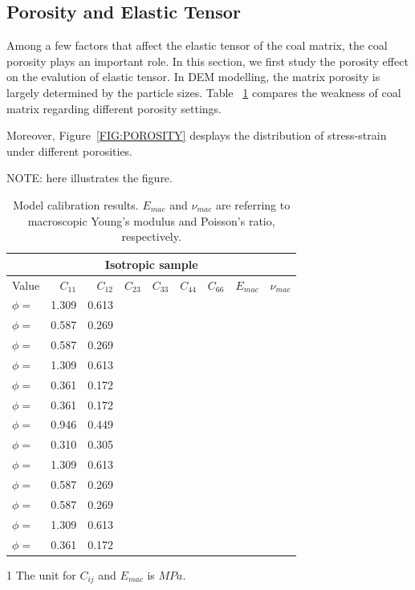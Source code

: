\documentclass[review,authoryear]{elsarticle}
\begin{document}
\subsection{Porosity and Elastic Tensor}\label{SEC:PORO}
Among a few factors that affect the elastic tensor of the coal matrix, the coal porosity plays an important role. In this section, we first study the porosity effect on the evalution of elastic tensor. In DEM modelling, the matrix porosity is largely determined by the particle sizes. Table~ \ref{TABLE:POROSITY} compares the weakness of coal matrix regarding different porosity settings.

Moreover, Figure~\ref{FIG:POROSITY} desplays the distribution of stress-strain under different porosities.

NOTE: here illustrates the figure.

\begin{table}
\centering
\caption{Model calibration results. $E_{mac}$ and $\nu_{mac}$ are referring to macroscopic Young's modulus and Poisson's ratio, respectively. }
\begin{threeparttable}[b]
\begin{tabular} {lrrrrrrrr}
\hline\hline 
 \multicolumn{9}{c}{Isotropic sample} \\
 \hline
Value\tnote{1} & $C_{11}$ & $C_{12}$ &  $C_{23}$ & $C_{33}$ & $C_{44}$ & $C_{66}$ & $E_{mac}$ & $\nu_{mac}$\\
\hline
$\phi=$ 		& 1.309 & 0.613 \\
$\phi=$  		& 0.587 & 0.269 \\
$\phi=$  		& 0.587 & 0.269 \\
$\phi=$ 		& 1.309 & 0.613 \\
$\phi=$ 		& 0.361 & 0.172 \\
$\phi=$ 		& 0.361 & 0.172 \\
$\phi=$   	    & 0.946 & 0.449 \\
$\phi=$ 	  	& 0.310 & 0.305 \\
$\phi=$ 		& 1.309 & 0.613 \\
$\phi=$  		& 0.587 & 0.269 \\
$\phi=$  		& 0.587 & 0.269 \\
$\phi=$ 		& 1.309 & 0.613 \\
$\phi=$ 		& 0.361 & 0.172 \\
\hline    
\bottomrule
\end{tabular}\label{TABLE:POROSITY}
\begin{tablenotes}
      \small
      \item [1] The unit for $C_{ij}$ and $E_{mac}$ is $MPa$.
	\end{tablenotes}
\end{threeparttable}
\end{table}
\end{document}
